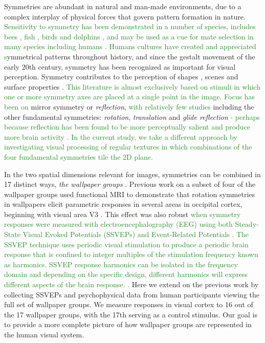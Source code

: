 \documentclass[11pt, twoside]{article}
\begin{document}
Symmetries are abundant in natural and man-made environments, due to a complex interplay of physical forces that govern pattern formation in nature. \textcolor{ForestGreen}{Sensitivity to symmetry has been demonstrated in a number of species, includes bees \citep{giurfa_insect_symmetry_1996}, fish \citep{morris_swordtail_symmetry_1998,schluter_sailfin_symmetry_1998}, birds \citep{RN1337,swaddle_symmetry_finches_1994} and dolphins \citep{von_fersen_dolphin_symmetry_1992}, and may be used as a cue for mate selection in many species \citep{swaddle_asymmetry_review_1999} including humans \citep{rhodes_facial_1998}. Humans cultures have created and appreciated s}ymmetrical patterns throughout history, and since the gestalt movement of the early 20th century, symmetry has been recognized as important for visual perception. Symmetry contributes to the perception of shapes \citep{RN1311,RN1682}, scenes \citep{apthorp_symmetry_numerosity} and surface properties \citep{RN1166}. \textcolor{ForestGreen}{This literature is almost exclusively based on stimuli in which one or more symmetry axes are placed at a single point in the image. Focus has been on} mirror symmetry or \textit{reflection}, \textcolor{ForestGreen}{with relatively few studies} including the other fundamental symmetries: \textit{rotation}, \textit{translation} and \textit{glide reflection} \citep{wagemans_1998} \textcolor{ForestGreen}{- perhaps because reflection has been found to be more perceptually salient \citep{mach_1959,royer_1981,palmer_1991,ogden_2016,hamada_1988} and produce more brain activity \citep{makin_2013,makin_2014,makin_2012,wright_2015}. In the current study, we take a different approach by investigating visual processing of regular textures in which combinations of the four fundamental symmetries tile the 2D plane.}

In the two spatial dimensions relevant for images, symmetries can be combined in 17 distinct ways, \textit{the wallpaper groups} \citep{RN1562,RN1563,RN1425}. Previous work on a subset of four of the wallpaper groups used functional MRI to demonstrate that rotation symmetries in wallpapers elicit parametric responses in several areas in occipital cortex, beginning with visual area V3 \citep{RN1725}. This effect was also robust \textcolor{ForestGreen}{when symmetry responses were measured with electroencephalography (EEG) using both Steady-State Visual Evoked Potentials (SSVEPs)\citep{RN1725} and Event-Related Potentials \citep{RN1959}. The SSVEP technique uses periodic visual stimulation to produce a periodic brain response that is confined to integer multiples of the stimulation frequency known as harmonics. SSVEP response harmonics can be isolated in the frequency domain and depending on the specific design, different harmonics will express different aspects of the brain response. \citep{RN1540}.} Here we extend on the previous work by collecting SSVEPs and psychophysical data from human participants viewing the full set of wallpaper groups. We measure responses in visual cortex to 16 out of the 17 wallpaper groups, with the 17th serving as a control stimulus. Our goal is to provide a more complete picture of how wallpaper groups are represented in the human visual system.
\end{document}
